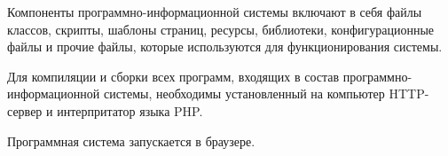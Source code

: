 Компоненты программно-информационной системы включают в себя файлы классов, скрипты, шаблоны страниц, ресурсы, библиотеки, конфигурационные файлы и прочие файлы, которые используются для функционирования системы.

Для компиляции и сборки всех программ, входящих в состав программно-информационной системы, необходимы установленный на компьютер HTTP-сервер и интерпритатор языка PHP.

Программная система запускается в браузере.



%
%
